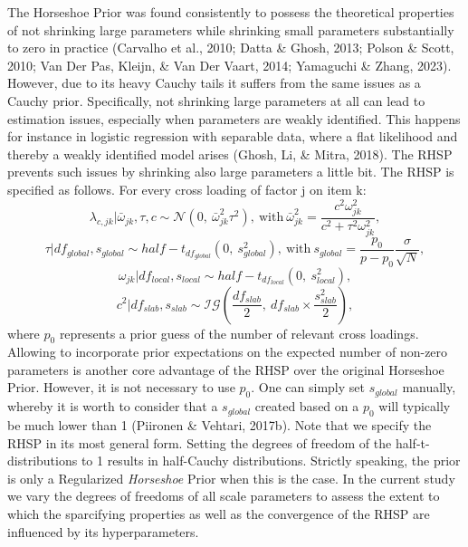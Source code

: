 \documentclass[
  man, donotrepeattitle,floatsintext]{apa6}
\begin{document}
The Horseshoe Prior was found consistently to possess the theoretical
properties of not shrinking large parameters while shrinking small
parameters substantially to zero in practice (Carvalho et al., 2010; Datta \& Ghosh, 2013; Polson \& Scott, 2010; Van Der Pas, Kleijn, \& Van Der Vaart, 2014; Yamaguchi \& Zhang, 2023). However, due to its
heavy Cauchy tails it suffers from the same issues as a Cauchy prior.
Specifically, not shrinking large parameters at all can lead to
estimation issues, especially when parameters are weakly identified.
This happens for instance in logistic regression with separable data,
where a flat likelihood and thereby a weakly identified model arises
(Ghosh, Li, \& Mitra, 2018). The RHSP prevents such issues by shrinking also large
parameters a little bit. The RHSP is specified as follows. For every
cross loading of factor j on item k:
\[\lambda_{c,jk} | \bar{\omega}_{jk}, \tau, c\sim \mathcal{N}(0, \ \bar{\omega}^2_{jk} \tau^2), \ \text{with} \ \bar{\omega}^2_{jk} = \frac{c^2\omega_{jk}^2}{c^2 + \tau^2 \omega_{jk}^2},\]
\[\tau | df_{global}, s_{global} \sim half-t_{df_{global}}(0,\  s_{global}^2), \ \text{with} \  s_{global} = \frac{p_0}{p-p_0}\frac{\sigma}{\sqrt{N}},\]
\[\omega_{jk}| df_{local}, s_{local} \sim half-t_{df_{local}}(0, \ s_{local}^2),\]
\[c^2 | df_{slab}, s_{slab} \sim \mathcal{IG}(\frac{df_{slab}}{2}, \  df_{slab} \times \frac{s_{slab}^2}{2}),\]
where \(p_0\) represents a prior guess of the number of relevant cross
loadings. Allowing to incorporate prior expectations on the expected
number of non-zero parameters is another core advantage of the RHSP over
the original Horseshoe Prior. However, it is not necessary to use \(p_0\).
One can simply set \(s_{global}\) manually, whereby it is worth to
consider that a \(s_{global}\) created based on a \(p_0\) will typically be
much lower than 1 (Piironen \& Vehtari, 2017b). Note that we specify the
RHSP in its most general form. Setting the degrees of freedom of the
half-t-distributions to 1 results in half-Cauchy distributions. Strictly
speaking, the prior is only a Regularized \emph{Horseshoe} Prior when this is
the case. In the current study we vary the degrees of freedoms of all
scale parameters to assess the extent to which the sparcifying
properties as well as the convergence of the RHSP are influenced by its
hyperparameters.
\end{document}
